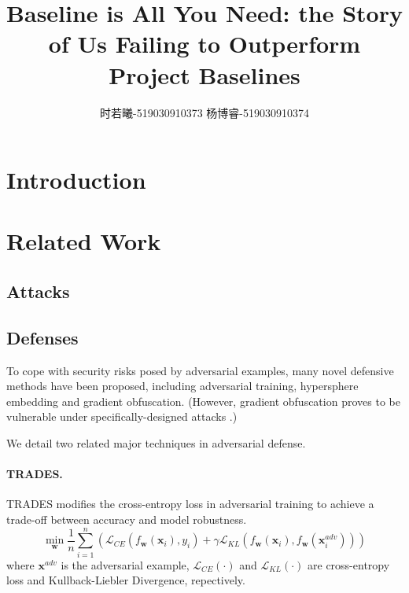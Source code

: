 \documentclass{article}
\title{Baseline is All You Need: the Story of Us Failing to Outperform Project Baselines}
\author{时若曦-519030910373 \quad 杨博睿-519030910374}
\date{}
\begin{document}
\maketitle

\section{Introduction}\label{sec:Intro}


\section{Related Work}\label{sec:RelatedWork}
    \subsection{Attacks}


    \subsection{Defenses}
    To cope with security risks posed by adversarial examples, many novel defensive methods have been proposed, including adversarial training, hypersphere embedding \cite{pang2020boosting} and gradient obfuscation. (However, gradient obfuscation proves to be vulnerable under specifically-designed attacks \cite{athalye2018obfuscated}.)

    We detail two related major techniques in adversarial defense.
    \paragraph{TRADES.} TRADES \cite{zhang2019theoretically} modifies the cross-entropy loss in adversarial training to achieve a trade-off between accuracy and model robustness.
    \begin{equation}\label{eq:trades}
        \min_{\mathbf{w}} \frac{1}{n}\sum_{i=1}^n \left( \mathcal{L}_{CE}\left( f_{\mathbf{w}}(\mathbf{x}_i), y_i \right) + \gamma\mathcal{L}_{KL}\left(f_{\mathbf{w}}(\mathbf{x}_i), f_{\mathbf{w}}(\mathbf{x}_i^{adv})\right) \right)
    \end{equation}
    where $\mathbf{x}^{adv}$ is the adversarial example, $\mathcal{L}_{CE}(\cdot)$ and $\mathcal{L}_{KL}(\cdot)$ are cross-entropy loss and Kullback-Liebler Divergence, repectively.
\end{document}
